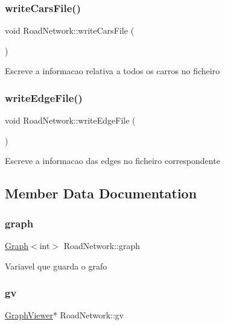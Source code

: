 \subsubsection{\texorpdfstring{write\+Cars\+File()}{writeCarsFile()}}
{\footnotesize\ttfamily void Road\+Network\+::write\+Cars\+File (\begin{DoxyParamCaption}{ }\end{DoxyParamCaption})}

Escreve a informacao relativa a todos os carros no ficheiro \mbox{\label{class_road_network_a8b2c18eac996760101db4afc6c114b14}} 
\subsubsection{\texorpdfstring{write\+Edge\+File()}{writeEdgeFile()}}
{\footnotesize\ttfamily void Road\+Network\+::write\+Edge\+File (\begin{DoxyParamCaption}{ }\end{DoxyParamCaption})}

Escreve a informacao das edges no ficheiro correspondente 

\subsection{Member Data Documentation}
\mbox{\label{class_road_network_aecef1ce1d95a05cccb98b345bae951ad}} 
\subsubsection{\texorpdfstring{graph}{graph}}
{\footnotesize\ttfamily \mbox{\hyperlink{class_graph}{Graph}}$<$int$>$ Road\+Network\+::graph\hspace{0.3cm}{\ttfamily [private]}}

Variavel que guarda o grafo \mbox{\label{class_road_network_a3512bc7d6e202925537873f3e769141c}} 
\subsubsection{\texorpdfstring{gv}{gv}}
{\footnotesize\ttfamily \mbox{\hyperlink{class_graph_viewer}{Graph\+Viewer}}$\ast$ Road\+Network\+::gv\hspace{0.3cm}{\ttfamily [private]}}

